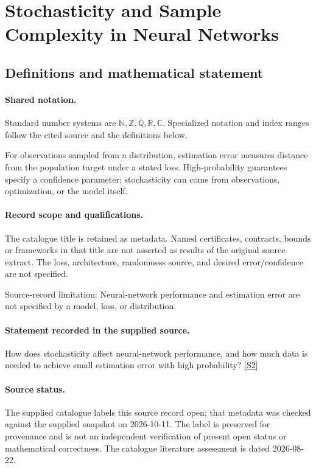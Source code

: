 \documentclass[11pt]{article}
\newcommand{\sref}[2]{\hyperlink{source:#1:#2}{[S#2]}}
\begin{document}
\section{Stochasticity and Sample Complexity in Neural Networks}\label{statement}

\subsection{Definitions and mathematical statement}

\paragraph{Shared notation.}Standard number systems are $\mathbb N,\mathbb Z,\mathbb Q,\mathbb R,\mathbb C$. Specialized notation and index ranges follow the cited source and the definitions below.


For observations sampled from a distribution, estimation error measures distance from the population target under a stated loss. High-probability guarantees specify a confidence parameter; stochasticity can come from observations, optimization, or the model itself.
\paragraph{Record scope and qualifications.}
The catalogue title is retained as metadata. Named certificates, contracts, bounds or frameworks in that title are not asserted as results of the original source extract.
The loss, architecture, randomness source, and desired error/confidence are not specified.

Source-record limitation: Neural-network performance and estimation error are not specified by a model, loss, or distribution.
\paragraph{Statement recorded in the supplied source.}
How does stochasticity affect neural-network performance, and how much data is needed to achieve small estimation error with high probability? \sref{statement}{2}
\paragraph{Source status.}
The supplied catalogue labels this source record open; that metadata was checked against the supplied snapshot on 2026-10-11. The label is preserved for provenance and is not an independent verification of present open status or mathematical correctness. The catalogue literature assessment is dated 2026-08-22.
\end{document}
